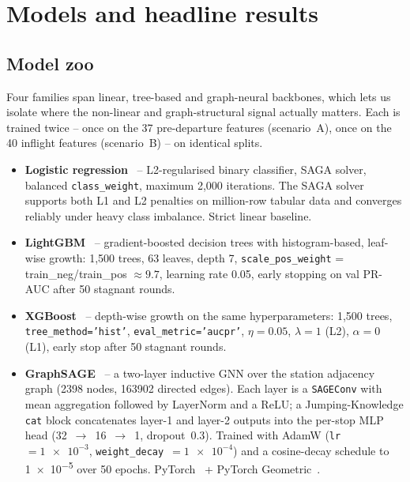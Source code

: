 \section{Models and headline results}
\label{sec:models}

\subsection{Model zoo}

Four families span linear, tree-based and graph-neural backbones, which lets us isolate where the non-linear and graph-structural signal actually matters. Each is trained twice -- once on the 37 pre-departure features (scenario~A), once on the 40 inflight features (scenario~B) -- on identical splits.

\begin{itemize}[leftmargin=*]
    \item \textbf{Logistic regression}~\cite{pedregosa2011scikit} -- L2-regularised binary classifier, SAGA solver, balanced \texttt{class\_weight}, maximum 2{,}000 iterations. The SAGA solver supports both L1 and L2 penalties on million-row tabular data and converges reliably under heavy class imbalance. Strict linear baseline.
    \item \textbf{LightGBM}~\cite{ke2017lightgbm} -- gradient-boosted decision trees with histogram-based, leaf-wise growth: 1{,}500 trees, 63 leaves, depth 7, \texttt{scale\_pos\_weight} = train\_neg/train\_pos $\approx 9.7$, learning rate \num{0.05}, early stopping on val PR-AUC after 50 stagnant rounds.
    \item \textbf{XGBoost}~\cite{chen2016xgboost} -- depth-wise growth on the same hyperparameters: 1{,}500 trees, \texttt{tree\_method='hist'}, \texttt{eval\_metric='aucpr'}, $\eta=\num{0.05}$, $\lambda=1$ (L2), $\alpha=0$ (L1), early stop after 50 stagnant rounds.
    \item \textbf{GraphSAGE}~\cite{hamilton2017inductive} -- a two-layer inductive GNN over the station adjacency graph (\num{2398} nodes, \num{163902} directed edges). Each layer is a \texttt{SAGEConv} with mean aggregation followed by LayerNorm and a ReLU; a Jumping-Knowledge \texttt{cat} block concatenates layer-1 and layer-2 outputs into the per-stop MLP head (32~$\to$~16~$\to$~1, dropout~\num{0.3}). Trained with AdamW (\texttt{lr}~$=\num{1e-3}$, \texttt{weight\_decay}~$=\num{1e-4}$) and a cosine-decay schedule to \num{1e-5} over 50 epochs. PyTorch~\cite{paszke2019pytorch} + PyTorch Geometric~\cite{fey2019fast}.
\end{itemize}

